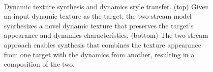\begin{figure}[t]
\begin{center}
	\\
	\caption[Dynamic texture synthesis and dynamics style transfer]{Dynamic texture synthesis and dynamics style transfer. (top) Given an input dynamic texture as the target, the two-stream model synthesizes a novel dynamic texture that preserves the target's appearance and dynamics characteristics. (bottom) The two-stream approach enables synthesis that combines the texture appearance from one target with the dynamics from another, resulting in a composition of the two.}
	\vspace{-0.65cm}
	\label{fig:teaser}
\end{center}
\end{figure}